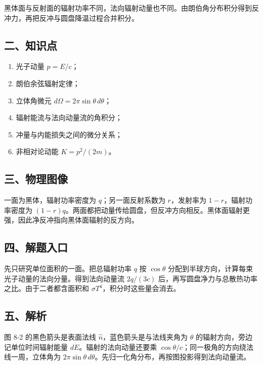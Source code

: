 \documentclass[12pt,a4paper,UTF8]{ctexart}
\newcommand{\tightlist}{\setlength{\itemsep}{0pt}\setlength{\parskip}{0pt}}
\begin{document}
黑体面与反射面的辐射功率不同，法向辐射动量也不同。由朗伯角分布积分得到反冲力，再把反冲与圆盘降温过程合并积分。

\subsection{二、知识点}\label{ux4e8cux77e5ux8bc6ux70b9-7}

\begin{enumerate}
\def\labelenumi{\arabic{enumi}.}
\tightlist
\item
  光子动量 \(p=E/c\)；
\item
  朗伯余弦辐射定律；
\item
  立体角微元 \(d\Omega=2\pi\sin\theta\,d\theta\)；
\item
  辐射能流与法向动量流的角积分；
\item
  冲量与内能损失之间的微分关系；
\item
  非相对论动能 \(K=p^2/(2m)\)。
\end{enumerate}

\subsection{三、物理图像}\label{ux4e09ux7269ux7406ux56feux50cf-7}

一面为黑体，辐射功率密度为 \(q\)；另一面反射系数为 \(r\)，发射率为
\(1-r\)，辐射功率密度为
\((1-r)q\)。两面都把动量传给圆盘，但反冲方向相反。黑体面辐射更强，因此净反冲指向黑体面辐射的反方向。

\subsection{四、解题入口}\label{ux56dbux89e3ux9898ux5165ux53e3-7}

先只研究单位面积的一面。把总辐射功率 \(q\) 按 \(\cos\theta\)
分配到半球方向，计算每束光子动量的法向分量。得到法向动量流 \(2q/(3c)\)
后，再写圆盘净力与总散热功率之比。由于二者都含面积和
\(\sigma T^4\)，积分时这些量会消去。

\subsection{五、解析}\label{ux4e94ux89e3ux6790-7}

图 8-2 的黑色箭头是表面法线 \(\hat n\)，蓝色箭头是与法线夹角为
\(\theta\) 的辐射方向，旁边记单位时间辐射能量
\(d\dot E\)。辐射的法向动量还要乘
\(\cos\theta/c\)；同一极角的方向绕法线一周，立体角为
\(2\pi\sin\theta\,d\theta\)。先归一化角分布，再按图投影得到法向动量流。
\end{document}
